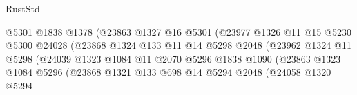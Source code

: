 \begin{lexlean}{RustStd}
\begin{coremodule}
                                          @5301
                                          @1838
                                          @1378
                                          (@23863
                                            @1327
                                            @16
                                            @5301
                                            (@23977
                                              @1326
                                              @11
                                              @15
                                              @5230
                                              @5300
                                              @24028
                                              (@23868
                                                @1324
                                                @133
                                                @11
                                                @14
                                                @5298
                                                @2048
                                                (@23962
                                                  @1324
                                                  @11
                                                  @5298
                                                  (@24039
                                                    @1323
                                                    @1084
                                                    @11
                                                    @2070
                                                    @5296
                                                    @1838
                                                    @1090
                                                    (@23863
                                                      @1323
                                                      @1084
                                                      @5296
                                                      (@23868
                                                        @1321
                                                        @133
                                                        @698
                                                        @14
                                                        @5294
                                                        @2048
                                                        (@24058
                                                          @1320
                                                          @5294

\end{coremodule}
\end{lexlean}
